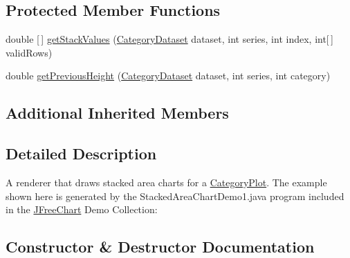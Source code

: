 \subsection*{Protected Member Functions}
\begin{DoxyCompactItemize}
\item 
double \mbox{[}$\,$\mbox{]} \mbox{\hyperlink{classorg_1_1jfree_1_1chart_1_1renderer_1_1category_1_1_stacked_area_renderer_ae411c6a8047fe594f5bef6c7921d249a}{get\+Stack\+Values}} (\mbox{\hyperlink{interfaceorg_1_1jfree_1_1data_1_1category_1_1_category_dataset}{Category\+Dataset}} dataset, int series, int index, int\mbox{[}$\,$\mbox{]} valid\+Rows)
\item 
double \mbox{\hyperlink{classorg_1_1jfree_1_1chart_1_1renderer_1_1category_1_1_stacked_area_renderer_ad81ee52b117087d77bf6def419826f90}{get\+Previous\+Height}} (\mbox{\hyperlink{interfaceorg_1_1jfree_1_1data_1_1category_1_1_category_dataset}{Category\+Dataset}} dataset, int series, int category)
\end{DoxyCompactItemize}
\subsection*{Additional Inherited Members}


\subsection{Detailed Description}
A renderer that draws stacked area charts for a \mbox{\hyperlink{}{Category\+Plot}}. The example shown here is generated by the {\ttfamily Stacked\+Area\+Chart\+Demo1.\+java} program included in the \mbox{\hyperlink{classorg_1_1jfree_1_1chart_1_1_j_free_chart}{J\+Free\+Chart}} Demo Collection\+: ~\newline
~\newline
  

\subsection{Constructor \& Destructor Documentation}
\mbox{\label{classorg_1_1jfree_1_1chart_1_1renderer_1_1category_1_1_stacked_area_renderer_a6b85a2294f6cadef351b8f9456613f47}} 
